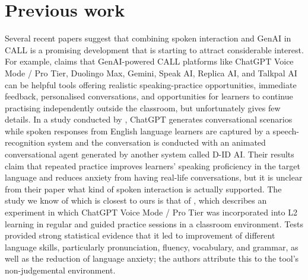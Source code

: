 \documentclass[11pt,a4paper]{article}
\begin{document}
\section{Previous work}

Several recent papers suggest that combining spoken interaction and GenAI in CALL is a promising development that is starting to attract considerable interest. For example, \citet[p.~122]{Savvidou2026} claims that GenAI-powered CALL platforms like ChatGPT Voice Mode / Pro Tier, Duolingo Max, Gemini, Speak AI, Replica AI, and Talkpal AI can be helpful tools offering realistic speaking-practice opportunities, immediate feedback, personalised conversations, and opportunities for learners to continue practising independently outside the classroom, but unfortunately gives few details. In a study conducted by \citet{LuEtAl2026}, ChatGPT generates conversational scenarios while spoken responses from English language learners are captured by a speech-recognition system and the conversation is conducted with an animated conversational agent generated by another system called D-ID AI. Their results claim that repeated practice improves learners' speaking proficiency in the target language and reduces anxiety from having real-life conversations, but it is unclear from their paper what kind of spoken interaction is actually supported. The study we know of which is closest to ours is that of \citet{CarreraNunezEtAl2025}, which describes an experiment in which ChatGPT Voice Mode / Pro Tier was incorporated into L2 learning in regular and guided practice sessions in a classroom environment. Tests provided strong statistical evidence that it led to improvement of different language skills, particularly pronunciation, fluency, vocabulary, and grammar, as well as the reduction of language anxiety; the authors attribute this to the tool's non-judgemental environment.
\end{document}

